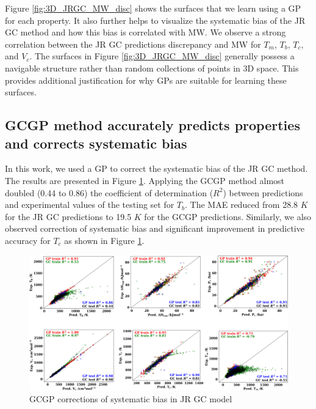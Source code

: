 \documentclass[journal=jacsat,manuscript=article]{achemso}
\begin{document}
Figure \ref{fig:3D_JRGC_MW_disc} shows the surfaces that we learn using a GP for each property. It also further helps to visualize the systematic bias of the JR GC method and how this bias is correlated with MW. We observe a strong correlation between the JR GC predictions discrepancy and MW for $T_m$, $T_b$, $T_c$, and $V_c$. The surfaces in Figure \ref{fig:3D_JRGC_MW_disc} generally possess a navigable structure rather than random collections of points in 3D space. This provides additional justification for why GPs are suitable for learning these surfaces.


\subsection{GCGP method accurately predicts properties and corrects systematic bias}

In this work, we used a GP to correct the systematic bias of the JR GC method. The results are presented in Figure \ref{fig:GCGP_final_results}.
Applying the GCGP method almost doubled (0.44 to 0.86) the coefficient of determination ($R^2$) between predictions and experimental values of the testing set for $T_b$. The MAE reduced from 28.8 $K$ for the JR GC predictions to 19.5 $K$ for the GCGP predictions. 
Similarly, we also observed correction of systematic bias and significant improvement in predictive accuracy for $T_c$ as shown in Figure \ref{fig:GCGP_final_results}.

\begin{figure}[H]
    \centering
    \includegraphics[width=1.1\linewidth]{images/GCGP_final_results.png}
    \caption{GCGP corrections of systematic bias in JR GC model}
    \label{fig:GCGP_final_results}
\end{figure}
\end{document}
